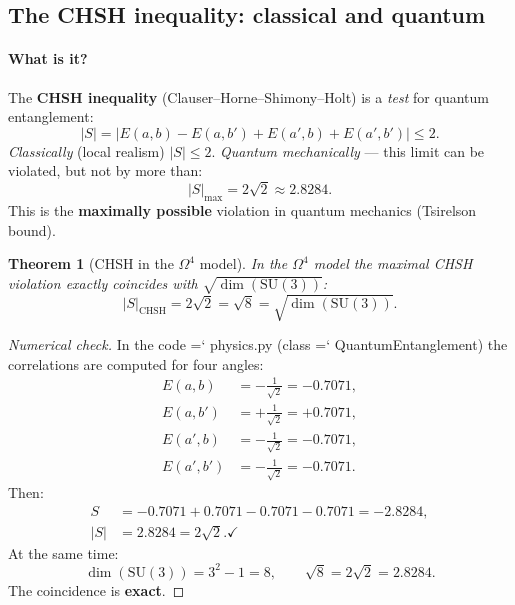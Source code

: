 \documentclass[11pt,a4paper]{article}
\newcommand{\SU}{\mathrm{SU}}
\newcommand{\Om}{\Omega^4}
\renewcommand{\texttt}[1]{{\ttfamily\hyphenchar\font=`\- #1}}
\newtheorem{theorem}{Theorem}[section]
\theoremstyle{definition}
\begin{document}
\subsection{The CHSH inequality: classical and quantum}
\label{subsec:chsh}

\paragraph{What is it?}
The \textbf{CHSH inequality} (Clauser--Horne--Shimony--Holt) is 
a \emph{test} for quantum entanglement:
\begin{equation}
    |S| = |E(a,b) - E(a,b') + E(a',b) + E(a',b')| \le 2.
    \label{eq:chsh-classical}
\end{equation}
\emph{Classically} (local realism) $|S| \le 2$. 
\emph{Quantum mechanically} — this limit can be violated, but not by more than:
\begin{equation}
    |S|_{\max} = 2\sqrt{2} \approx 2.8284.
    \label{eq:chsh-quantum}
\end{equation}
This is the \textbf{maximally possible} violation in quantum 
mechanics (Tsirelson bound).

\begin{theorem}[CHSH in the $\Om$ model]
\label{thm:chsh-omega4}
In the $\Om$ model the maximal CHSH violation \emph{exactly} 
coincides with $\sqrt{\dim(\SU(3))}$:
\begin{equation}
    \boxed{
    |S|_{\text{CHSH}} = 2\sqrt{2} = \sqrt{8} 
    = \sqrt{\dim(\SU(3))}.
    }
    \label{eq:chsh-main}
\end{equation}
\end{theorem}

\begin{proof}[Numerical check]
In the code \texttt{physics.py} (class \texttt{QuantumEntanglement}) 
the correlations are computed for four angles:
\begin{align}
    E(a, b) &= -\frac{1}{\sqrt{2}} = -0.7071, \\
    E(a, b') &= +\frac{1}{\sqrt{2}} = +0.7071, \\
    E(a', b) &= -\frac{1}{\sqrt{2}} = -0.7071, \\
    E(a', b') &= -\frac{1}{\sqrt{2}} = -0.7071.
\end{align}
Then:
\begin{align}
    S &= -0.7071 + 0.7071 - 0.7071 - 0.7071 = -2.8284, \\
    |S| &= 2.8284 = 2\sqrt{2}. \checkmark
\end{align}
At the same time:
\begin{equation}
    \dim(\SU(3)) = 3^2 - 1 = 8, \qquad 
    \sqrt{8} = 2\sqrt{2} = 2.8284.
\end{equation}
The coincidence is \textbf{exact}.
\end{proof}
\end{document}
